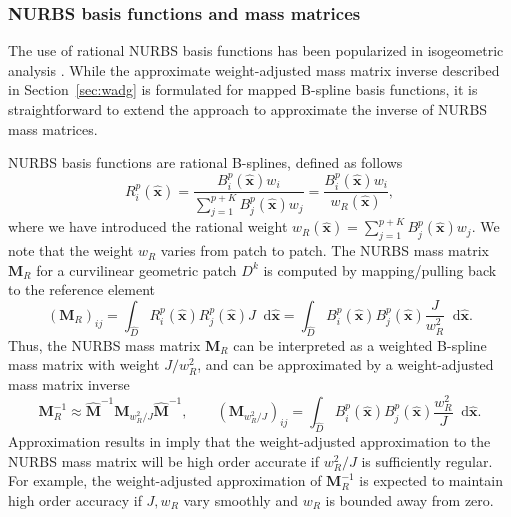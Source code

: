 \documentclass[preprint,10pt]{elsarticle}
\newcommand{\nor}[1]{\left\| #1 \right\|}
\newcommand{\LRp}[1]{\left( #1 \right)}
\newcommand{\Dhat}{\widehat{D}}
\newcommand{\reviewerTwo}[1]{#1}
\newcommand{\note}[1]{{\color{blue}{#1}}}
\newcommand*\diff[1]{\mathop{}\!{\mathrm{d}#1}}
\begin{document}
\subsubsection{NURBS basis functions and mass matrices}
\label{sec:wadgnurbs}

\reviewerTwo{The use of rational NURBS basis functions has been popularized in isogeometric analysis \cite{hughes2005isogeometric}.  While the approximate weight-adjusted mass matrix inverse described in Section~\ref{sec:wadg} is formulated for mapped B-spline basis functions, it is straightforward to extend the approach to approximate the inverse of NURBS mass matrices.  

NURBS basis functions are rational B-splines, defined as follows 
\begin{equation*}
R^p_i(\widehat{\bm{x}}) = \frac{B^p_i(\widehat{\bm{x}}) w_i}{\sum_{j=1}^{p+K}B^p_j(\widehat{\bm{x}}) w_j} = \frac{B^p_i(\widehat{\bm{x}}) w_i}{w_R(\widehat{\bm{x}})},
\end{equation*}
where we have introduced the rational weight $w_R(\widehat{\bm{x}}) = \sum_{j=1}^{p+K}B^p_j(\widehat{\bm{x}}) w_j$.  We note that the weight $w_R$ varies from patch to patch.  The NURBS mass matrix $\bm{M}_R$ for a curvilinear geometric patch $D^k$ is computed by mapping/pulling back to the reference element
\[
(\bm{M}_R)_{ij} = \int_{\Dhat} R^p_i(\widehat{\bm{x}}) R^p_j(\widehat{\bm{x}}) J\diff{\widehat{\bm{x}}} = \int_{\Dhat} B^p_i(\widehat{\bm{x}}) B^p_j(\widehat{\bm{x}}) \frac{J}{w_R^2}\diff{\widehat{\bm{x}}}.  
\]
Thus, the NURBS mass matrix $\bm{M}_R$ can be interpreted as a weighted B-spline mass matrix with weight $J/w_R^2$, and can be approximated by a weight-adjusted mass matrix inverse 
\[
\bm{M}_R^{-1} \approx \widehat{\bm{M}}^{-1} \bm{M}_{w_R^2/J}  \widehat{\bm{M}}^{-1}, \qquad  \LRp{\bm{M}_{w_R^2/J}}_{ij} = \int_{\Dhat} B^p_i(\widehat{\bm{x}})B^p_j(\widehat{\bm{x}}) \frac{w_R^2}{J}\diff{\widehat{\bm{x}}}.
\]
Approximation results in \cite{bazilevs2006isogeometric, evans2013explicit} imply that the weight-adjusted approximation to the NURBS mass matrix will be high order accurate if $w_R^2/J$ is sufficiently regular.  For example, the weight-adjusted approximation of $\bm{M}_R^{-1}$ is expected to maintain high order accuracy if $J, w_R$ vary smoothly and $w_R$ is bounded away from zero.  
}

%
\end{document}
